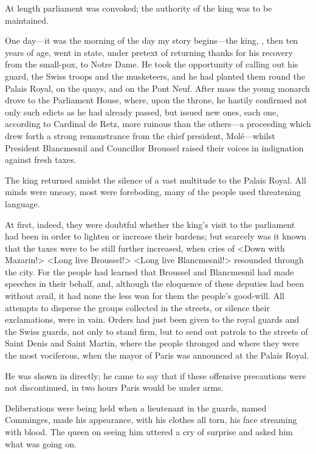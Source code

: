 At length parliament was convoked; the authority of the king was to be maintained.

One day—it was the morning of the day my story begins—the king, , then ten years of age, went in state, under pretext of returning thanks for his recovery from the small-pox, to Notre Dame. He took the opportunity of calling out his guard, the Swiss troops and the musketeers, and he had planted them round the Palais Royal, on the quays, and on the Pont Neuf. After mass the young monarch drove to the Parliament House, where, upon the throne, he hastily confirmed not only such edicts as he had already passed, but issued new ones, each one, according to Cardinal de Retz, more ruinous than the others—a proceeding which drew forth a strong remonstrance from the chief president, Molé—whilst President Blancmesnil and Councillor Broussel raised their voices in indignation against fresh taxes.

The king returned amidst the silence of a vast multitude to the Palais Royal. All minds were uneasy, most were foreboding, many of the people used threatening language.

At first, indeed, they were doubtful whether the king's visit to the parliament had been in order to lighten or increase their burdens; but scarcely was it known that the taxes were to be still further increased, when cries of <Down with Mazarin!> <Long live Broussel!> <Long live Blancmesnil!> resounded through the city. For the people had learned that Broussel and Blancmesnil had made speeches in their behalf, and, although the eloquence of these deputies had been without avail, it had none the less won for them the people's good-will. All attempts to disperse the groups collected in the streets, or silence their exclamations, were in vain. Orders had just been given to the royal guards and the Swiss guards, not only to stand firm, but to send out patrols to the streets of Saint Denis and Saint Martin, where the people thronged and where they were the most vociferous, when the mayor of Paris was announced at the Palais Royal.

He was shown in directly; he came to say that if these offensive precautions were not discontinued, in two hours Paris would be under arms.

Deliberations were being held when a lieutenant in the guards, named Comminges, made his appearance, with his clothes all torn, his face streaming with blood. The queen on seeing him uttered a cry of surprise and asked him what was going on.

